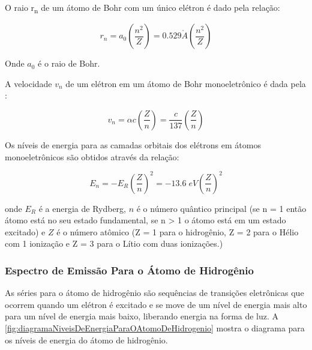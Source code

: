 \documentclass[11pt,a4paper]{article}
\begin{document}
                O raio r\textsubscript{n} de um átomo de Bohr com um único elétron é dado pela  relação:

                    \begin{equation}
                        r_n = a_0 \left(\frac{n^2}{Z}\right) = 0.529 \mathring{A} \left(\frac{n^2}{Z}\right)
                    \end{equation}

                Onde $a_0$ é o raio de Bohr.

                A velocidade $v_n$ de um elétron em um átomo de Bohr monoeletrônico é dada pela :

                    \begin{equation}
                        v_n  = \alpha c \left(\frac{Z}{n}\right) = \frac{c}{137}\left(\frac{Z}{n}\right)
                    \end{equation}

                Os níveis de energia para as camadas orbitais dos elétrons em átomos monoeletrônicos são obtidos através da relação:

                    \begin{equation}
                        E_n = -E_R \left(\frac{Z}{n}\right)^2 = -13.6 \; eV \left(\frac{Z}{n}\right)^2
                    \end{equation}

                \noindent onde $E_R$ é a energia de Rydberg, $n$ é  o número quântico principal (se n = 1 então átomo está no seu estado fundamental, se n > 1 o átomo está em um estado excitado) e $Z$ é o número atômico (Z = 1 para o hidrogênio, Z = 2 para o Hélio com 1 ionização e Z = 3 para o Lítio com duas ionizações.) 
            
            \subsubsection{Espectro de Emissão Para o Átomo de Hidrogênio}

                As séries para o átomo de hidrogênio são sequências de transições eletrônicas que ocorrem quando um elétron é excitado e se move de um nível de energia mais alto para um nível de energia mais baixo, liberando energia na forma de luz. A \ref{fig:diagramaNiveisDeEnergiaParaOAtomoDeHidrogenio} mostra o diagrama para os níveis de energia do átomo de hidrogênio. 
\end{document}
